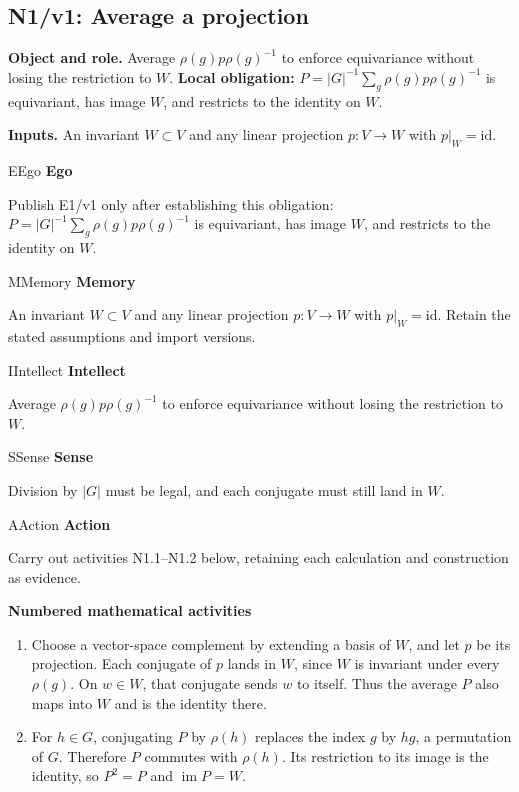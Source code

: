 \documentclass[preprint,12pt,aps,pra,showkeys,amsmath,amssymb,superscriptaddress,floatfix]{revtex4-2}
\theoremstyle{definition}
\theoremstyle{remark}
\newcommand{\mmfaculty}[3]{%
 \begin{mmfacultybox}{#1}{#2}
 {\sffamily\bfseries\color{MMBlue}#2}\par\smallskip #3
 \end{mmfacultybox}}
\newcommand{\field}[2]{\par\smallskip\noindent\textbf{#1.} #2\par}
\begin{document}
\subsection{N1/v1: Average a projection}

\field{Object and role}{Average \(\rho(g)p\rho(g)^{-1}\) to enforce equivariance without losing
the restriction to \(W\). \textbf{Local obligation:}
\(P=|G|^{-1}\sum_g\rho(g)p\rho(g)^{-1}\) is equivariant, has image
\(W\), and restricts to the identity on \(W\).}

\field{Inputs}{An invariant \(W\subset V\) and any linear projection \(p:V\to W\) with
\(p|_W=\mathrm{id}\).}

\mmfaculty{E}{Ego}{Publish E1/v1 only after establishing this obligation:
\(P=|G|^{-1}\sum_g\rho(g)p\rho(g)^{-1}\) is equivariant, has image
\(W\), and restricts to the identity on \(W\).}

\mmfaculty{M}{Memory}{An invariant \(W\subset V\) and any linear projection \(p:V\to W\) with
\(p|_W=\mathrm{id}\). Retain the stated assumptions and import versions.}

\mmfaculty{I}{Intellect}{Average \(\rho(g)p\rho(g)^{-1}\) to enforce equivariance without losing
the restriction to \(W\).}

\mmfaculty{S}{Sense}{Division by \(|G|\) must be legal, and each conjugate must still land in
\(W\).}

\mmfaculty{A}{Action}{Carry out activities N1.1--N1.2 below, retaining each calculation and
construction as evidence.}

\smallskip\noindent\textbf{Numbered mathematical activities}

\begin{enumerate}[label=N1.\arabic*,leftmargin=3.4em]

\item Choose a vector-space complement by extending a basis of \(W\), and let
\(p\) be its projection. Each conjugate of \(p\) lands in \(W\), since
\(W\) is invariant under every \(\rho(g)\). On \(w\in W\), that
conjugate sends \(w\) to itself. Thus the average \(P\) also maps into
\(W\) and is the identity there.

\item For \(h\in G\), conjugating \(P\) by \(\rho(h)\) replaces the index
\(g\) by \(hg\), a permutation of \(G\). Therefore \(P\) commutes with
\(\rho(h)\). Its restriction to its image is the identity, so \(P^2=P\)
and \(\operatorname{im}P=W\).

\end{enumerate}
\end{document}
